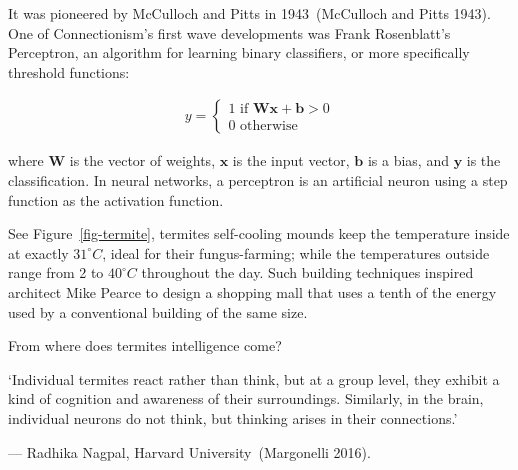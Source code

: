 \documentclass[
  letterpaper,
  12pt,
  british]{tufte-book}
\renewenvironment{quote}{
  \list{}{\leftmargin=3.5cm\topsep=0pt}
  \item\relax\small\itshape
}
{\endlist}
\theoremstyle{plain}
\theoremstyle{definition}
\theoremstyle{plain}
\theoremstyle{remark}
\begin{document}
It was pioneered by McCulloch and Pitts in 1943~(McCulloch and Pitts
1943).
One of Connectionism's first wave developments was Frank Rosenblatt's
Perceptron, an algorithm for learning binary classifiers, or more
specifically threshold functions:

\begin{align}          
     y=
     \begin{cases}
         1 \text{ if } \mathbf{W}\mathbf{x}+ \mathbf{b}> 0\\
         0 \text{ otherwise }
     \end{cases}
 \end{align}

where \(\mathbf{W}\) is the vector of weights, \(\mathbf{x}\) is the
input vector, \(\mathbf{b}\) is a bias, and \(\mathbf{y}\) is the
classification. In neural networks, a perceptron is an artificial neuron
using a step function as the activation function.

See Figure~\ref{fig-termite}, termites self-cooling mounds keep the
temperature inside at exactly \(31^{\circ} C\), ideal for their
fungus-farming; while the temperatures outside range from 2 to
\(40^{\circ} C\) throughout the day. Such building techniques inspired
architect Mike Pearce to design a shopping mall that uses a tenth of the
energy used by a conventional building of the same size.

From where does termites intelligence come?

\begin{quote}
`Individual termites react rather than think, but at a group level, they
exhibit a kind of cognition and awareness of their surroundings.
Similarly, in the brain, individual neurons do not think, but thinking
arises in their connections.'

--- Radhika Nagpal, Harvard University~(Margonelli
2016).
\end{quote}
\end{document}
